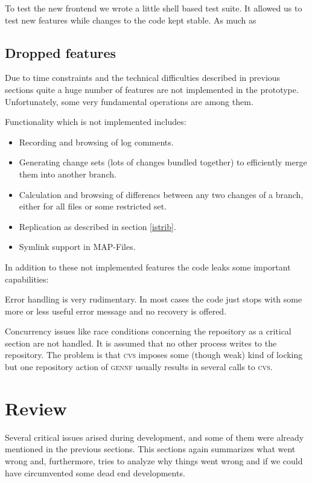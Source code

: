 \documentclass[fleqn, 10pt, a4paper]{report} \usepackage{amssymb}
\newcommand{\GENNF}{\textsc{gennf}}
\begin{document}
To test the new frontend we wrote a little shell based test suite. It allowed us 
to test new features while changes to the code kept stable. As much as 

\subsection{Dropped features}

Due to time constraints and the technical difficulties described in
previous sections quite a huge number of features are not
implemented in the prototype. Unfortunately, some very fundamental
operations are among them.

Functionality which is not implemented includes:

\begin{itemize}
\item Recording and browsing of log comments.
\item Generating change sets (lots of changes bundled together) to
  efficiently merge them into another branch.
\item Calculation and browsing of differencs between any two changes
  of a branch, either for all files or some restricted set.
\item Replication as described in section \ref{istrib}.
\item Symlink support in MAP-Files.
\end{itemize}

In addition to these not implemented features the code leaks some
important capabilities:

Error handling is very rudimentary. In most cases the code just stops
with some more or less useful error message and no recovery is
offered.

Concurrency issues like race conditions concerning the repository as a
critical section are not handled. It is assumed that no other process
writes to the repository. The problem is that \textsc{cvs} imposes
some (though weak) kind of locking but one repository action of
\GENNF{} usually results in several calls to \textsc{cvs}.


\section{Review}

Several critical issues arised during development, and some of them
were already mentioned in the previous sections.
This sections again summarizes what went wrong and, furthermore, tries
to analyze why things went wrong and if we could have circumvented
some dead end developments.
\end{document}
